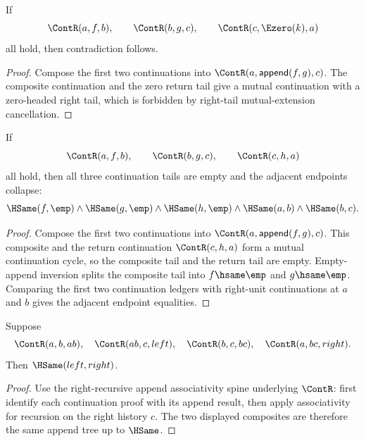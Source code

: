 \begin{theorem}
\label{thm:cont-triangle-cycle-right-zero-tail-absurd}
If
$$
\ContR(a,f,b),\qquad
\ContR(b,g,c),\qquad
\ContR(c,\Ezero(k),a)
$$
all hold, then contradiction follows.
\end{theorem}
\begin{proof}
Compose the first two continuations into
$\ContR(a,\mathsf{append}(f,g),c)$. The composite continuation and the zero
return tail give a mutual continuation with a zero-headed right tail, which is
forbidden by right-tail mutual-extension cancellation.
\end{proof}

\begin{theorem}
\label{thm:continuation-triangle-cycle-tails-empty}
If
$$
\ContR(a,f,b),\qquad
\ContR(b,g,c),\qquad
\ContR(c,h,a)
$$
all hold, then all three continuation tails are empty and the adjacent
endpoints collapse:
$$
\HSame(f,\emp)\land \HSame(g,\emp)\land \HSame(h,\emp)\land
\HSame(a,b)\land \HSame(b,c).
$$
\end{theorem}
\begin{proof}
Compose the first two continuations into
$\ContR(a,\mathsf{append}(f,g),c)$. This composite and the return continuation
$\ContR(c,h,a)$ form a mutual continuation cycle, so the composite tail and
the return tail are empty. Empty-append inversion splits the composite tail
into $f\hsame\emp$ and $g\hsame\emp$. Comparing the first two continuation
ledgers with right-unit continuations at $a$ and $b$ gives the adjacent
endpoint equalities.
\end{proof}

\begin{theorem}
\label{thm:continuation-associativity-up-to-hsame-proof-standing}
Suppose
$$
\ContR(a,b,ab),\quad \ContR(ab,c,left),\quad
\ContR(b,c,bc),\quad \ContR(a,bc,right).
$$
Then \(\HSame(left,right)\).
\end{theorem}
\begin{proof}
Use the right-recursive append associativity spine underlying $\ContR$: first identify each continuation proof with its append result, then apply associativity for recursion on the right history $c$. The two displayed composites are therefore the same append tree up to $\HSame$.
\end{proof}

